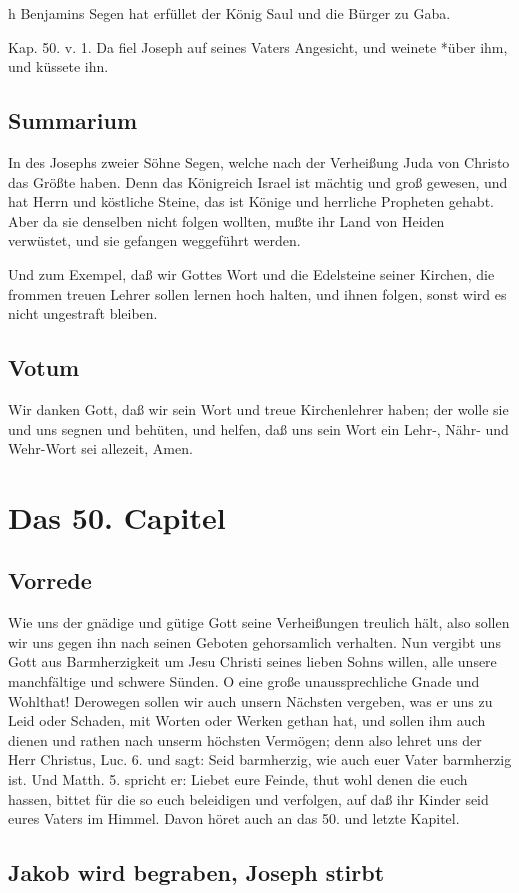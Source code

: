 h Benjamins Segen hat erfüllet der König Saul und die Bürger zu Gaba.

Kap. 50. v. 1. Da fiel Joseph auf seines Vaters Angesicht, und weinete *über ihm, und küssete ihn.

\section{Summarium}

In des Josephs zweier Söhne Segen, welche nach der Verheißung Juda von Christo das Größte haben. Denn das Königreich Israel ist mächtig und groß gewesen, und hat Herrn und
köstliche Steine, das ist Könige und herrliche Propheten gehabt. Aber da sie denselben nicht folgen wollten, mußte ihr Land von Heiden verwüstet, und sie gefangen weggeführt werden.

Und zum Exempel, daß wir Gottes Wort und die Edelsteine seiner Kirchen, die frommen treuen Lehrer sollen lernen hoch halten, und ihnen folgen, sonst wird es nicht ungestraft bleiben.

\section{Votum}

Wir danken Gott, daß wir sein Wort und treue Kirchenlehrer haben; der wolle sie und uns segnen und behüten, und helfen, daß uns sein Wort ein Lehr-, Nähr- und Wehr-Wort sei allezeit, Amen.

\chapter{Das 50. Capitel}

\section{Vorrede}

Wie uns der gnädige und gütige Gott seine Verheißungen treulich hält, also sollen wir uns gegen ihn nach seinen Geboten gehorsamlich verhalten. Nun vergibt uns Gott aus Barmherzigkeit um Jesu Christi seines lieben Sohns willen, alle unsere manchfältige und schwere Sünden. O eine große unaussprechliche Gnade und Wohlthat! Derowegen sollen wir auch unsern Nächsten vergeben, was er uns zu Leid oder Schaden, mit Worten oder Werken gethan hat, und sollen ihm auch dienen und rathen nach unserm höchsten Vermögen; denn also lehret uns der Herr Christus, Luc. 6. und sagt: Seid barmherzig, wie auch euer Vater barmherzig ist. Und Matth. 5. spricht er: Liebet eure Feinde, thut wohl denen die euch hassen, bittet für die so euch beleidigen und verfolgen, auf daß ihr Kinder seid eures Vaters im Himmel. Davon höret auch an das 50. und letzte Kapitel.

\section{Jakob wird begraben, Joseph stirbt}
